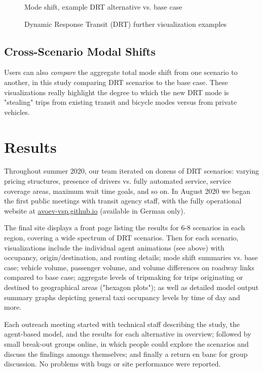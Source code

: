 \begin{figure}[ht]
\begin{minipage}[c]{0.32\textwidth}
     \caption{Mode shift, example DRT alternative vs. base case}
     \label{fig:pave-modeshift}
  \end{minipage}
  \caption{Dynamic Response Transit (DRT) further visualization examples}
\end{figure}


\subsection{Cross-Scenario Modal Shifts}

Users can also \emph{compare} the aggregate total mode shift from one scenario to another, in this study comparing DRT scenarios to the base case. These visualizations really highlight the degree to which the new DRT mode is "stealing" trips from existing transit and bicycle modes versus from private vehicles.


\section{Results}
\label{pave-results}

Throughout summer 2020, our team iterated on dozens of DRT scenarios: varying pricing structures, presence of drivers vs. fully automated service, service coverage areas, maximum wait time goals, and so on. In August 2020 we began the first public meetings with transit agency staff, with the fully operational website at \href{https://avoev-vsp.github.io}{avoev-vsp.github.io} (available in German only).

The final site displays a front page listing the results for 6-8 scenarios in each region, covering a wide spectrum of DRT scenarios. Then for each scenario, visualizations include the individual agent animations (see above) with occupancy, origin/destination, and routing details; mode shift summaries vs. base case; vehicle volume, passenger volume, and volume differences on roadway links compared to base case; aggregate levels of tripmaking for trips originating or destined to geographical areas ("hexagon plots"); as well as detailed model output summary graphs depicting general taxi occupancy levels by time of day and more.

Each outreach meeting started with technical staff describing the study, the agent-based model, and the results for each alternative in overview; followed by small break-out groups online, in which people could explore the scenarios and discuss the findings amongs themselves; and finally a return en banc for group discussion. No problems with bugs or site performance were reported.

